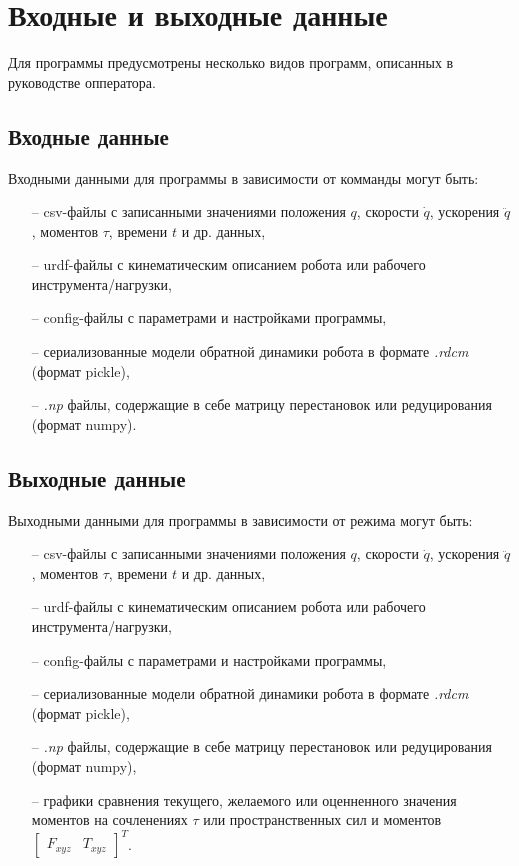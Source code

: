 \newpage
\section{Входные и выходные данные}
Для программы предусмотрены несколько видов программ, описанных в руководстве опператора.

\subsection{Входные данные}
Входными данными для программы в зависимости от комманды могут быть:
\begin{enumerate}
    \item [--] csv-файлы с записанными значениями положения $q$, скорости $\dot{q}$, ускорения $\ddot{q}$, моментов $\tau$, времени $t$ и др. данных,
	\item [--] urdf-файлы с кинематическим описанием робота или рабочего инструмента/нагрузки,
	\item [--] config-файлы с параметрами и настройками программы,
    \item [--] сериализованные модели обратной динамики робота в формате \textit{.rdcm} (формат pickle),
    \item [--] \textit{.np} файлы, содержащие в себе матрицу перестановок или редуцирования (формат numpy).
\end{enumerate}

\subsection{Выходные данные}
Выходными данными для программы в зависимости от режима могут быть:
\begin{enumerate}
    \item [--] csv-файлы с записанными значениями положения $q$, скорости $\dot{q}$, ускорения $\ddot{q}$, моментов $\tau$, времени $t$ и др. данных,
	\item [--] urdf-файлы с кинематическим описанием робота или рабочего инструмента/нагрузки,
	\item [--] config-файлы с параметрами и настройками программы,
    \item [--] сериализованные модели обратной динамики робота в формате \textit{.rdcm} (формат pickle),
    \item [--] \textit{.np} файлы, содержащие в себе матрицу перестановок или редуцирования (формат numpy),
    \item [--] графики сравнения текущего, желаемого или оценненного значения моментов на сочленениях $\tau$ или пространственных сил и моментов $\begin{bmatrix} F_{xyz} & T_{xyz}\end{bmatrix}^T$.
\end{enumerate}